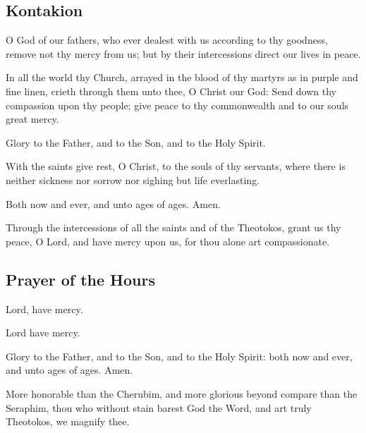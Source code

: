 \subsection{Kontakion}


O God of our fathers, who ever dealest with us according to thy goodness, remove not thy mercy from us; but by their intercessions direct our lives in peace.

In all the world thy Church, arrayed in the blood of thy martyrs as in purple and fine linen, crieth through them unto thee, O Christ our God: Send down thy compassion upon thy people; give peace to thy commonwealth and to our souls great mercy.

Glory to the Father, and to the Son, and to the Holy Spirit.

With the saints give rest, O Christ, to the souls of thy servants, where there is neither sickness nor sorrow nor sighing but life everlasting.

Both now and ever, and unto ages of ages. Amen.

Through the intercessions of all the saints and of the Theotokos, grant us thy peace, O Lord, and have mercy upon us, for thou alone art compassionate.


\subsection{Prayer of the Hours}

Lord, have mercy. 



Lord have mercy. 

Glory to the Father, and to the Son, and to the Holy Spirit: both now and ever, and unto ages of ages. Amen.

More honorable than the Cherubim, and more glorious beyond compare than the Seraphim, thou who without stain barest God the Word, and art truly Theotokos, we magnify thee.

